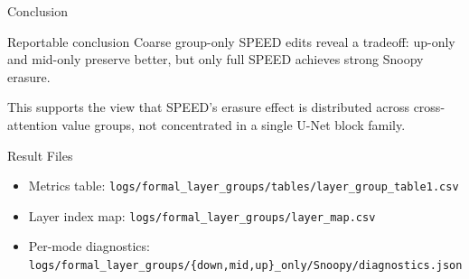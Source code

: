 \documentclass[aspectratio=169,11pt]{beamer}
\begin{document}
\begin{frame}{Conclusion}
  \begin{block}{Reportable conclusion}
    Coarse group-only SPEED edits reveal a tradeoff:
    up-only and mid-only preserve better, but only full SPEED achieves strong Snoopy erasure.
  \end{block}

  \vspace{0.7em}
  This supports the view that SPEED's erasure effect is distributed across cross-attention value groups,
  not concentrated in a single U-Net block family.
\end{frame}

\begin{frame}{Result Files}
  \small
  \begin{itemize}
    \item Metrics table:
      \texttt{logs/formal\_layer\_groups/tables/layer\_group\_table1.csv}
    \item Layer index map:
      \texttt{logs/formal\_layer\_groups/layer\_map.csv}
    \item Per-mode diagnostics:
      \texttt{logs/formal\_layer\_groups/\{down,mid,up\}\_only/Snoopy/diagnostics.json}
  \end{itemize}
\end{frame}
\end{document}
